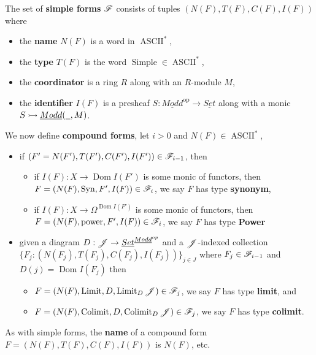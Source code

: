 \begin{defn}
 The set of \textbf{simple forms} $\scr{F}$ consists of tuples $(N(F),T(F),C(F),I(F))$ where
 \begin{itemize}
  \item the \textbf{name} $N(F)$ is a word in $\operatorname{ASCII}^\ast$,
  \item the \textbf{type} $T(F)$ is the word $\operatorname{Simple} \in \operatorname{ASCII}^\ast$,
  \item the \textbf{coordinator} is a ring $R$ along with an $R$-module $M$,
  \item the \textbf{identifier} $I(F)$ is a presheaf $S: \underline{Modd}^{\text{op}} \to \underline{Set}$ along with a monic $S \rightarrowtail \underline{Modd}(\und{0.2},M)$.
 \end{itemize}
 We now define \textbf{compound forms}, let $i > 0$ and $N(F) \in \operatorname{ASCII}^\ast$,
 \begin{itemize}
  \item if $(F' = N(F'), T(F'), C(F'), I(F')) \in \scr{F}_{i - 1}$, then
  \begin{itemize}
   \item if $I(F): X \to \operatorname{Dom}I(F')$ is some monic of functors, then $F = (N(F), \operatorname{Syn}, F', I(F)) \in \scr{F}_{i}$, we say $F$ has type \textbf{synonym},
   \item if $I(F): X \to \Omega^{\operatorname{Dom}I(F')}$ is some monic of functors, then $F = (N(F), \operatorname{power}, F', I(F)) \in \scr{F}_i$, we say $F$ has type \textbf{Power}
  \end{itemize}
    \item given a diagram $D: \scr{J} \to \underline{Set}^{\underline{Modd}^{op}}$ and a $\scr{J}$-indexed collection $\lbrace F_j: (N(F_j),T(F_j), C(F_j), I(F_j))\rbrace_{j \in J}$ where $F_j \in \scr{F}_{i-1}$ and $D(j) = \operatorname{Dom}I(F_j)$ then
    \begin{itemize}
     \item $F = (N(F), \operatorname{Limit}, D, \operatorname{Limit}_{D}\scr{J}) \in \scr{F}_j$, we say $F$ has type \textbf{limit}, and
     \item $F = (N(F), \operatorname{Colimit}, D, \operatorname{Colimit}_D\scr{J}) \in \scr{F}_j$, we say $F$ has type \textbf{colimit}.
    \end{itemize}
 \end{itemize}
As with simple forms, the \textbf{name} of a compound form $F = (N(F), T(F), C(F), I(F))$ is $N(F)$, etc.
\end{defn}

